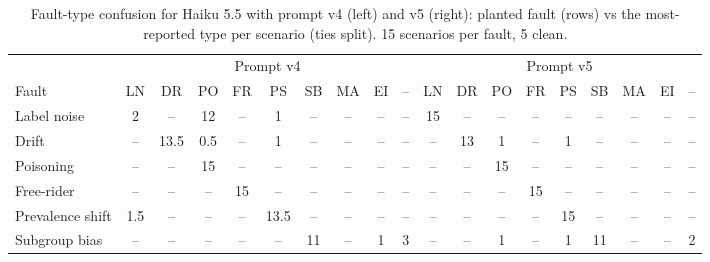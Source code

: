 \begin{table}[t]
\centering
\small
\setlength{\tabcolsep}{3pt}
\caption{Fault-type confusion for Haiku 5.5 with prompt v4 (left) and v5 (right): planted fault (rows) vs the most-reported type per scenario (ties split). 15 scenarios per fault, 5 clean.}
\label{tab:confusion}
\begin{tabular}{l|ccccccccc|ccccccccc}
\toprule
 & \multicolumn{9}{c}{Prompt v4} & \multicolumn{9}{c}{Prompt v5} \\
Fault & LN & DR & PO & FR & PS & SB & MA & EI & – & LN & DR & PO & FR & PS & SB & MA & EI & – \\
\midrule
Label noise & \cellcolor[RGB]{13,52,103}\textcolor[HTML]{EEF0F6}{2} & -- & \cellcolor[RGB]{138,185,241}\textcolor[HTML]{04050C}{12} & -- & \cellcolor[RGB]{17,40,76}\textcolor[HTML]{EEF0F6}{1} & -- & -- & -- & -- & \cellcolor[RGB]{205,226,251}\textcolor[HTML]{04050C}{15} & -- & -- & -- & -- & -- & -- & -- & -- \\
Drift & -- & \cellcolor[RGB]{172,206,246}\textcolor[HTML]{04050C}{13.5} & \cellcolor[RGB]{18,34,62}\textcolor[HTML]{EEF0F6}{0.5} & -- & \cellcolor[RGB]{17,40,76}\textcolor[HTML]{EEF0F6}{1} & -- & -- & -- & -- & -- & \cellcolor[RGB]{161,199,244}\textcolor[HTML]{04050C}{13} & \cellcolor[RGB]{17,40,76}\textcolor[HTML]{EEF0F6}{1} & -- & \cellcolor[RGB]{17,40,76}\textcolor[HTML]{EEF0F6}{1} & -- & -- & -- & -- \\
Poisoning & -- & -- & \cellcolor[RGB]{205,226,251}\textcolor[HTML]{04050C}{15} & -- & -- & -- & -- & -- & -- & -- & -- & \cellcolor[RGB]{205,226,251}\textcolor[HTML]{04050C}{15} & -- & -- & -- & -- & -- & -- \\
Free-rider & -- & -- & -- & \cellcolor[RGB]{205,226,251}\textcolor[HTML]{04050C}{15} & -- & -- & -- & -- & -- & -- & -- & -- & \cellcolor[RGB]{205,226,251}\textcolor[HTML]{04050C}{15} & -- & -- & -- & -- & -- \\
Prevalence shift & \cellcolor[RGB]{15,46,89}\textcolor[HTML]{EEF0F6}{1.5} & -- & -- & -- & \cellcolor[RGB]{172,206,246}\textcolor[HTML]{04050C}{13.5} & -- & -- & -- & -- & -- & -- & -- & -- & \cellcolor[RGB]{205,226,251}\textcolor[HTML]{04050C}{15} & -- & -- & -- & -- \\
Subgroup bias & -- & -- & -- & -- & -- & \cellcolor[RGB]{116,171,237}\textcolor[HTML]{04050C}{11} & -- & \cellcolor[RGB]{17,40,76}\textcolor[HTML]{EEF0F6}{1} & \cellcolor[RGB]{17,64,124}\textcolor[HTML]{EEF0F6}{3} & -- & -- & \cellcolor[RGB]{17,40,76}\textcolor[HTML]{EEF0F6}{1} & -- & \cellcolor[RGB]{17,40,76}\textcolor[HTML]{EEF0F6}{1} & \cellcolor[RGB]{116,171,237}\textcolor[HTML]{04050C}{11} & -- & -- & \cellcolor[RGB]{13,52,103}\textcolor[HTML]{EEF0F6}{2} \\

\end{tabular}
\end{table}
